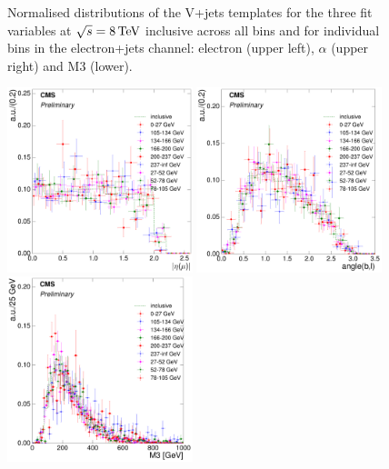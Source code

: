 \begin{figure}[hbtp]
	 \caption{Normalised distributions of the V+jets templates for the three fit variables at $\sqrt{s}=8\,\text{Te\hspace{-.08em}V}$
	 inclusive across all \wpt bins and for individual \wpt bins in the electron+jets channel: electron \abseta
	 (upper left), $\alpha$ (upper right) and M3 (lower).}
     \label{fig:WPT_fit_variable_vjets_comparisons_electron_8TeV}
\end{figure}

\begin{figure}[hbtp]
    \centering
     \includegraphics[width=0.48\textwidth]{Chapters/04_Analysis/04b_XSections/images/8TeV/fit_variables/muon/WPT/muon_absolute_eta/vjets/WPT_muon_absolute_eta_2orMoreBtags_VJets_template_comparison.pdf}\hfill
     \includegraphics[width=0.48\textwidth]{Chapters/04_Analysis/04b_XSections/images/8TeV/fit_variables/muon/WPT/angle_bl/vjets/WPT_angle_bl_2orMoreBtags_VJets_template_comparison.pdf}\hfill
     \includegraphics[width=0.48\textwidth]{Chapters/04_Analysis/04b_XSections/images/8TeV/fit_variables/muon/WPT/M3/vjets/WPT_M3_2orMoreBtags_VJets_template_comparison.pdf}\\

\end{figure}
